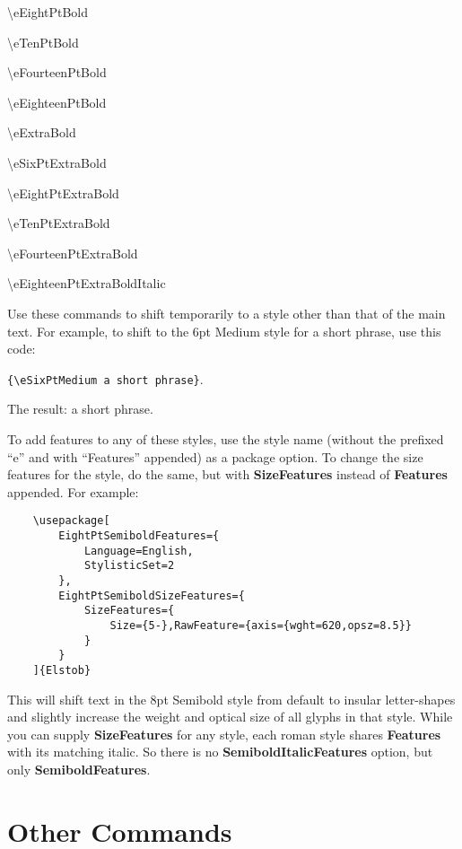 \documentclass[12pt]{article}
\begin{document}
\begin{multicols}{2}
\noindent\textbackslash eEightPtBold

\noindent\textbackslash eTenPtBold

\noindent\textbackslash eFourteenPtBold

\noindent\textbackslash eEighteenPtBold

\noindent\textbackslash eExtraBold

\noindent\textbackslash eSixPtExtraBold

\noindent\textbackslash eEightPtExtraBold

\noindent\textbackslash eTenPtExtraBold

\noindent\textbackslash eFourteenPtExtraBold

\noindent\textbackslash eEighteenPtExtraBoldItalic
\end{multicols}

\noindent Use these commands
to shift temporarily to a style other than that of the main text.
For example, to shift to the 6pt Medium style for a short phrase, use
this code:
\begin{center}
{\small\verb|{\eSixPtMedium a short phrase}|}.
\end{center}
The result: {\eSixPtMedium a short phrase}.

To add features to any of these styles, use the style name
(without the prefixed “e” and with “Features” appended)
as a package option. To change the size features for the style,
do the same, but with \textbf{SizeFeatures} instead of \textbf{Features}
appended. For example:

\footnotesize
\begin{verbatim}
    \usepackage[
        EightPtSemiboldFeatures={
            Language=English,
            StylisticSet=2
        },
        EightPtSemiboldSizeFeatures={
            SizeFeatures={
                Size={5-},RawFeature={axis={wght=620,opsz=8.5}}
            }
        }
    ]{Elstob}
\end{verbatim}\normalsize

\noindent This will shift text in the 8pt Semibold style from default to insular
letter-shapes and slightly increase the weight and optical size of all glyphs in that style.
While you can supply \textbf{SizeFeatures} for any style, each roman style shares
\textbf{Features} with its matching italic. So there is no \textbf{SemiboldItalicFeatures}
option, but only \textbf{SemiboldFeatures}.

\section{Other Commands}
\end{document}
